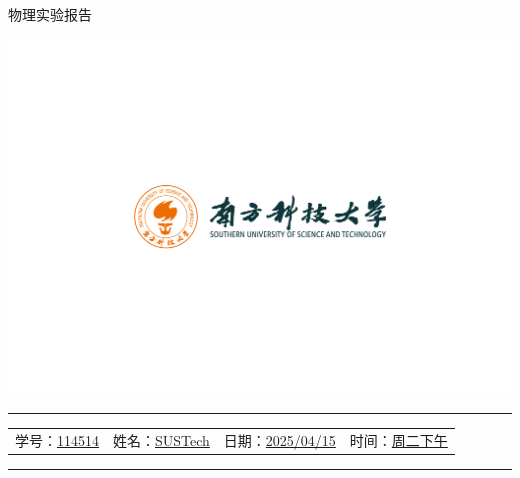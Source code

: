 \documentclass[12pt,a4paper]{article}
\begin{document}
	\noindent
	\hspace{-2em}
	\begin{minipage}[c]{0.65\textwidth}
		\raggedright
		{\fontsize{40pt}{60pt}\selectfont 物理实验报告}
	\end{minipage}
	\begin{minipage}[c]{0.35\textwidth}
		\raggedleft
		\includegraphics[width=\linewidth, trim={20cm 20cm 20cm 20cm}, clip]{university_logo.png}
	\end{minipage}

	\vspace{-1em}
	

	
	\hrule
	\vspace{0.4em}
	\noindent
	\begin{tabular}{l l l l}
    学号：\underline{114514} & 姓名：\underline{SUSTech} &
    日期：\underline{2025/04/15} & 时间：\underline{周二下午}
	\end{tabular}
	\vspace{-0em}
	\par
	\hrule

	

\end{document}
